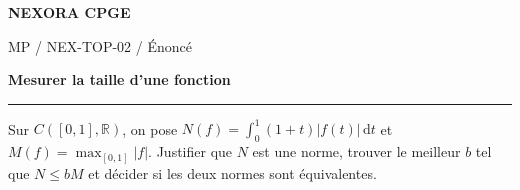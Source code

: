\documentclass[11pt,a4paper]{article}
\begin{document}
{\small\bfseries\color{nexorablue} NEXORA CPGE}\par
{\small MP / NEX-TOP-02 / Énoncé}\par
{\LARGE\bfseries Mesurer la taille d’une fonction}\par
\vspace{0.25em}\hrule\vspace{0.6em}

Sur $C([0,1],\mathbb R)$, on pose $N(f)=\int_0^1(1+t)|f(t)|\,\mathrm dt$ et $M(f)=\max_{[0,1]}|f|$. Justifier que $N$ est une norme, trouver le meilleur $b$ tel que $N\le bM$ et décider si les deux normes sont équivalentes.
\end{document}
